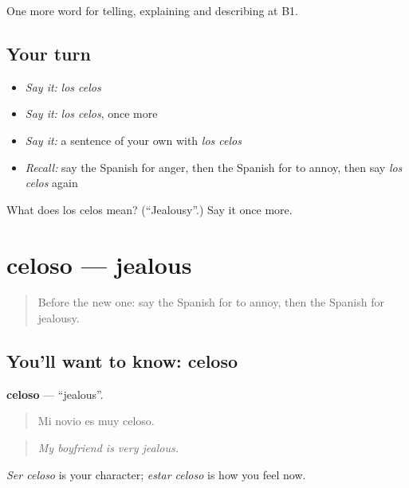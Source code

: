 \begin{grammarlens}[title={What you've built}]
One more word for telling, explaining and describing at B1.
\end{grammarlens}

\subsection*{Your turn}
\begin{itemize}
\raggedright
  \item \emph{Say it:} \emph{los celos}
  \item \emph{Say it:} \emph{los celos}, once more
  \item \emph{Say it:} a sentence of your own with \emph{los celos}
  \item \emph{Recall:} say the Spanish for anger, then the Spanish for to annoy, then say \emph{los celos} again
\end{itemize}

\begin{tcolorbox}[breakable,colback=teal!4,colframe=teal!35!black,title={Before you move on}]
What does los celos mean? (\textquotedblleft{}Jealousy\textquotedblright{}.) Say it once more.
\end{tcolorbox}
\section[celoso]{celoso — jealous}

\label{lesson:ES-C708-celoso}



\begin{quote}
Before the new one: say the Spanish for to annoy, then the Spanish for jealousy.
\end{quote}

\subsection*{You'll want to know: celoso}
\textbf{celoso} — \textquotedblleft{}jealous\textquotedblright{}.

\begin{quote}
Mi novio es muy celoso.
\end{quote}

\begin{quote}
\emph{My boyfriend is very jealous.}
\end{quote}

\emph{Ser celoso} is your character; \emph{estar celoso} is how you feel now.

